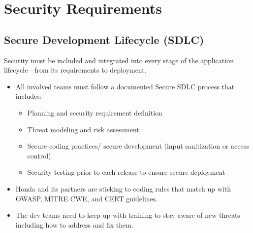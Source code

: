 \section{Security Requirements}
\subsection{Secure Development Lifecycle (SDLC)}
Security must be included and integrated into every stage of the application lifecycle—from its requirements to deployment.
\begin{itemize}
    \item All involved teams must follow a documented Secure SDLC process that includes:
\begin{itemize}
    \item Planning and security requirement definition 
    \item Threat modeling and risk assessment
    \item Secure coding practices/ secure development (input sanitization or access control)
    \item Security testing prior to each release to ensure secure deployment

\end{itemize}
\item Honda and its partners are sticking to coding rules that match up with OWASP, MITRE CWE, and CERT guidelines. 
\item The dev teams need to keep up with training to stay aware of new threats including how to address and fix them.
\end{itemize}
